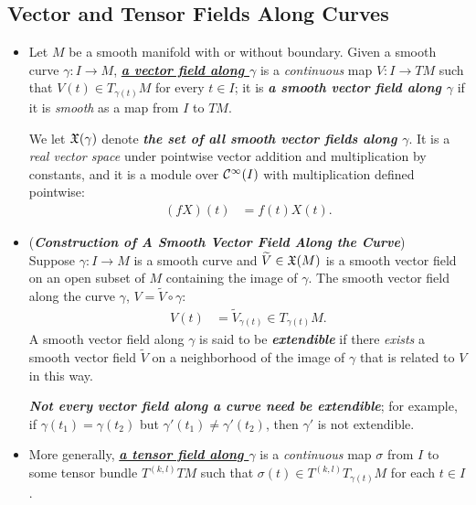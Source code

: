\documentclass[11pt]{article}
\begin{document}
\subsection{Vector and Tensor Fields Along Curves}
\begin{itemize}
\item \begin{definition}
Let $M$ be a smooth manifold with or without boundary. Given a smooth curve $\gamma: I \rightarrow M$, \underline{\emph{\textbf{a vector field along $\gamma$}}} is a \emph{continuous} map $V: I \rightarrow TM$ such that $V(t) \in T_{\gamma(t)}M$ for every $t \in I$; it is \emph{\textbf{a smooth vector field along $\gamma$}} if it is \emph{smooth} as a map from $I$ to $TM$. 

We let ${\mathfrak X}(\gamma)$ denote \emph{\textbf{the set of all smooth vector fields along $\gamma$}}. It is a \emph{real vector space} under pointwise vector addition and multiplication by constants, and it is a module over ${\mathcal C}^{\infty}(I)$ with multiplication defined pointwise:
\begin{align*}
(fX)(t) &= f(t)X(t).
\end{align*}
\end{definition}

\item \begin{remark} (\emph{\textbf{Construction of A Smooth Vector Field Along the Curve}})\\
Suppose $\gamma: I \rightarrow M$ is a smooth curve and $\widetilde{V} \in {\mathfrak X}(M)$ is a smooth vector field on an open subset of $M$ containing the image of $\gamma$. The smooth vector field along the curve $\gamma$, $V = \widetilde{V} \circ \gamma$:
\begin{align*}
V(t) &= \widetilde{V}_{\gamma(t)} \in T_{\gamma(t)}M.
\end{align*} A smooth vector field along $\gamma$ is said to be \emph{\textbf{extendible}} if there \emph{exists} a smooth vector field $\widetilde{V}$ on
a neighborhood of the image of $\gamma$ that is related to $V$ in this way. 

\emph{\textbf{Not every vector field along a curve need be extendible}}; for example, if $\gamma(t_1) = \gamma(t_2)$ but $\gamma'(t_1) \neq \gamma'(t_2)$, then $\gamma'$ is not extendible. 
\end{remark}

\item \begin{definition}
More generally, \underline{\emph{\textbf{a tensor field along $\gamma$}}} is a \emph{continuous} map $\sigma$ from $I$ to some tensor bundle $T^{(k,l)}TM$ such that $\sigma(t) \in T^{(k,l)}T_{\gamma(t)}M$ for each $t \in I$. 


\end{definition}
\end{itemize}
\end{document}
